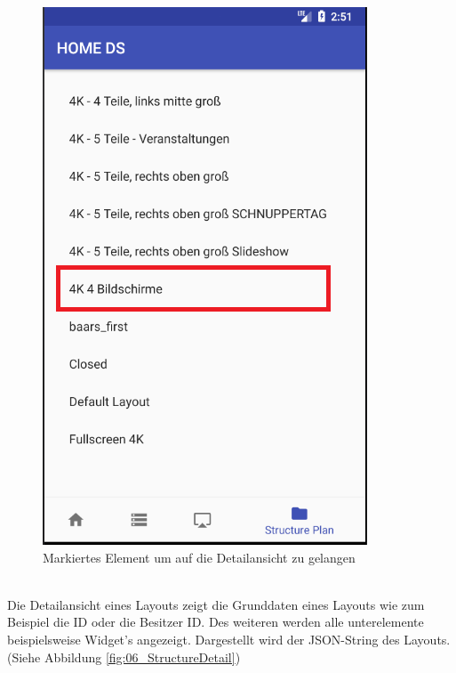 \begin{figure}[H]
\centering
\includegraphics[scale=0.35]{images/06_AndroidApp/06_StructureNavigationToDetail}
\caption{Markiertes Element um auf die Detailansicht zu gelangen}
\label{fig:06_StructureNavigationToDetail}
\end{figure}
\\
Die Detailansicht eines Layouts zeigt die Grunddaten eines Layouts wie zum Beispiel die ID oder die Besitzer ID. Des weiteren werden alle unterelemente beispielsweise Widget's angezeigt. Dargestellt wird der JSON-String des Layouts.
(Siehe Abbildung \ref{fig:06_StructureDetail})
\\
